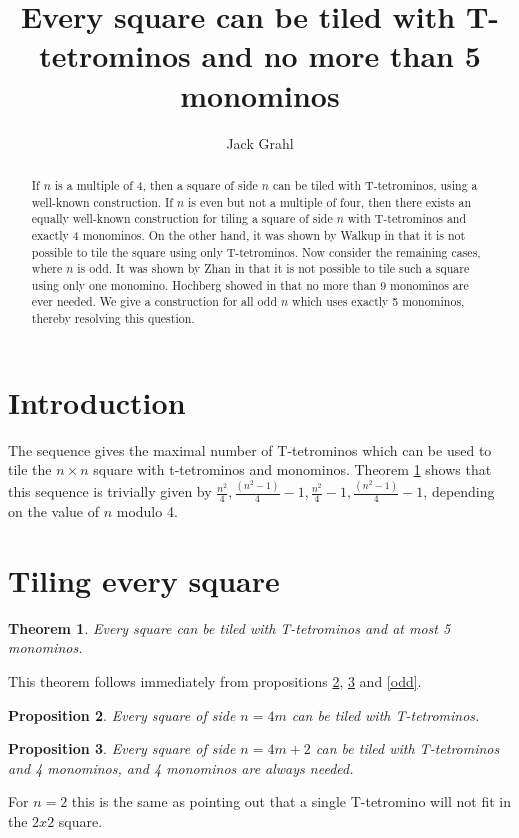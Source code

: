 \documentclass{article}
\title{Every square can be tiled with T-tetrominos and no more than 5 monominos}
\author{Jack Grahl}
\theoremstyle{plain}
\newtheorem{theorem}{Theorem}[section]
\newtheorem{proposition}[theorem]{Proposition}
\begin{document}
\maketitle

\begin{abstract}
If $n$ is a multiple of 4, then a square of side $n$ can be tiled with T-tetrominos, using a well-known construction.
If $n$ is even but not a multiple of four, then there exists an equally well-known construction for tiling a square of side $n$ with T-tetrominos and exactly 4 monominos.
On the other hand, it was shown by Walkup in \cite{walkup} that it is not possible to tile the square using only T-tetrominos.
Now consider the remaining cases, where $n$ is odd.
It was shown by Zhan in \cite{zhan} that it is not possible to tile such a square using only one monomino.
Hochberg showed in \cite{hochberg} that no more than 9 monominos are ever needed.
We give a construction for all odd $n$ which uses exactly 5 monominos, thereby resolving this question.
\end{abstract}

\section{Introduction}
The sequence \cite{oeis} gives the maximal number of T-tetrominos which can be used to tile the $n \times n$ square with t-tetrominos and monominos. Theorem \ref{main} shows that this sequence is trivially given by $\frac{n^2}{4}, \frac{(n^2-1)}{4}-1, \frac{n^2}{4}-1, \frac{(n^2-1)}{4}-1$, depending on the value of $n$ modulo 4.
\section{Tiling every square}
\begin{theorem}\label{main}
Every square can be tiled with T-tetrominos and at most 5 monominos.
\end{theorem}
This theorem follows immediately from propositions \ref{four}, \ref{even} and \ref{odd}.

\begin{proposition}\label{four}
Every square of side $n = 4m$ can be tiled with T-tetrominos.
\end{proposition}
\begin{proposition}\label{even}
Every square of side $n = 4m + 2$ can be tiled with T-tetrominos and 4 monominos, and 4 monominos are always needed.
\end{proposition}
For $n = 2$ this is the same as pointing out that a single T-tetromino will not fit in the $2x2$ square.
\end{document}
